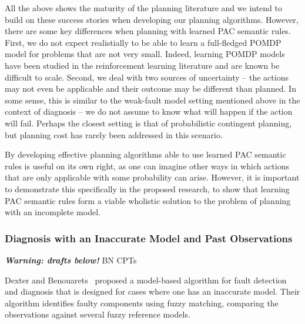 \documentclass[12pt]{article}
\newcommand{\note}[1]{\textbf{\textit{#1}}}
\begin{document}
All the above shows the maturity of the planning literature 
and we intend to build on these success stories when developing our  planning algorithms. However, there are some key differences 
when planning with learned PAC semantic rules. First, we do not expect realistially to be able to learn a full-fledged POMDP model for problems that are not very small. Indeed, learning POMDP models have been studied in the reinforcement learning literature and are known be difficult to scale. 
Second, we deal with two sources of uncertainty -- the actions may not even be applicable and their outcome may be different than planned. In some sense, this is similar to the weak-fault model setting mentioned above in the context of diagnosis -- we do not assume to know what will happen if the action will fail. Perhaps the closest setting is that of probabilistic contingent planning, but planning cost has rarely been addressed in this scenario. 


By developing effective planning algorithms able to use learned PAC semantic rules is useful on its own right, as one can imagine other ways in which actions that are only applicable with some probability can arise. However, 
it is important to demonstrate this specifically in the proposed research, to show that learning PAC semantic rules form a viable wholistic solution to the problem of planning with an incomplete model. 










\subsubsection{Diagnosis with an Inaccurate Model and Past Observations}
\note{Warning: drafts below!}
BN 
CPTs



Dexter and Benouarets~\cite{dexter1997model} proposed a model-based algorithm for fault detection and diagnosis that is designed for cases where one has an inaccurate model. Their algorithm identifies faulty components using fuzzy matching, comparing the observations against several fuzzy reference models. 
\end{document}
